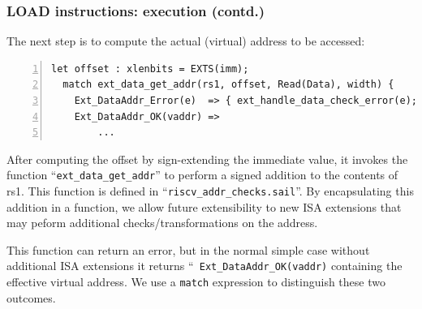 \documentclass[aspectratio=169]{beamer}
\newcommand{\slidefont}{\scriptsize}
\newcommand{\cf}{\scriptsize\tt}
\begin{document}
\begin{frame}[fragile]
  \frametitle{LOAD instructions: execution (contd.)}

  \slidefont

  The next step is to compute the actual (virtual) address to be accessed:

  \begin{Verbatim}[frame=single, numbers=left, label = File riscv\_insts\_base.sail]
  let offset : xlenbits = EXTS(imm);
  match ext_data_get_addr(rs1, offset, Read(Data), width) {
    Ext_DataAddr_Error(e)  => { ext_handle_data_check_error(e); RETIRE_FAIL },
    Ext_DataAddr_OK(vaddr) =>
        ...
  \end{Verbatim}

  \begin{minipage}{\textwidth}
    After computing the offset by sign-extending the immediate value,
    it invokes the function ``{\cf ext\_data\_get\_addr}'' to perform
    a signed addition to the contents of rs1.  This function is
    defined in ``{\cf riscv\_addr\_checks.sail}''.  By encapsulating
    this addition in a function, we allow future extensibility to new
    ISA extensions that may peform additional checks/transformations
    on the address.

    \vspace{1ex}

    This function can return an error, but in the normal simple case
    without additional ISA extensions it returns ``{\cf
      Ext\_DataAddr\_OK(vaddr)} containing the effective virtual
    address.  We use a {\cf match} expression to distinguish these two
    outcomes.
  \end{minipage}


\end{frame}

\end{document}
